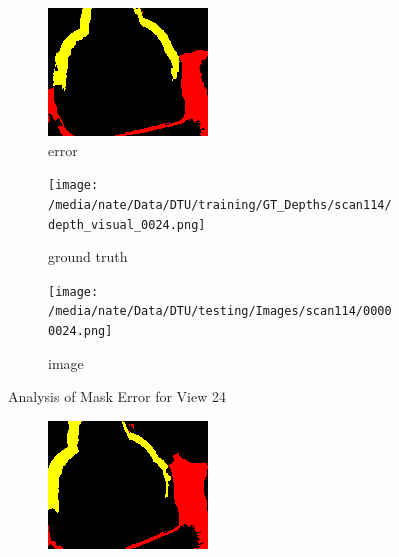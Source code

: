 \documentclass{article}
\begin{document}
\begin{figure}
\begin{subfigure}{0.3\textwidth}
		\includegraphics[width=\textwidth]{./output/024_error.png}
		\caption{error}
		\label{fig:error24}
	\end{subfigure}
	\hfill
	\centering
	\begin{subfigure}{0.3\textwidth}
		\centering
		\texttt{[image: /media/nate/Data/DTU/training/GT\_Depths/scan114/depth\_visual\_0024.png]}
		\caption{ground truth}
		\label{fig:gt24}
	\end{subfigure}
	\hfill
	\centering
	\begin{subfigure}{0.3\textwidth}
		\centering
		\texttt{[image: /media/nate/Data/DTU/testing/Images/scan114/00000024.png]}
		\caption{image}
		\label{fig:img24}
	\end{subfigure}
	\hfill
	\caption{Analysis of Mask Error for View 24}
	\label{fig:error_analys24}
\end{figure}\begin{figure}
	\centering
	\begin{subfigure}{0.3\textwidth}
		\centering
		\includegraphics[width=\textwidth]{./output/025_error.png}

\end{subfigure}
\end{figure}
\end{document}
